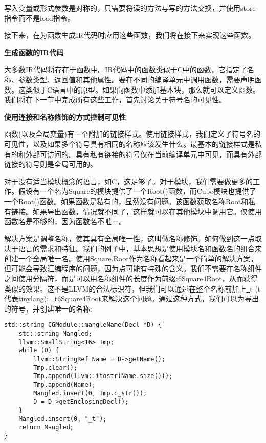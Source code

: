写入变量或形式参数是对称的，只需要将读的方法与写的方法交换，并使用store指令而不是load指令。\par

接下来，在为函数生成IR代码时应用这些函数，我们将在接下来实现这些函数。\par

\hspace*{\fill} \par %
\textbf{生成函数的IR代码}

大多数IR代码将存在于函数中。IR代码中的函数类似于C中的函数，它指定了名称、参数类型、返回值和其他属性。要在不同的编译单元中调用函数，需要声明函数。这类似于C语言中的原型。如果向函数中添加基本块，那么就可以定义函数。我们将在下一节中完成所有这些工作，首先讨论关于符号名的可见性。\par

\hspace*{\fill} \par %
\textbf{使用连接和名称修饰的方式控制可见性}

函数(以及全局变量)有一个附加的链接样式。使用链接样式，我们定义了符号名的可见性，以及如果多个符号具有相同的名称应该发生什么。最基本的链接样式是私有的和外部可访问的。具有私有链接的符号仅在当前编译单元中可见，而具有外部链接的符号则是全局可用的。\par

对于没有适当模块概念的语言，如C，这足够了。对于模块，我们需要做更多的工作。假设有一个名为Square的模块提供了一个Root()函数，而Cube模块也提供了一个Root()函数。如果函数是私有的，显然没有问题。该函数获取名称Root和私有链接。如果导出函数，情况就不同了，这样就可以在其他模块中调用它。仅使用函数名是不够的，因为函数名不唯一。\par

解决方案是调整名称，使其具有全局唯一性，这叫做名称修饰。如何做到这一点取决于语言的需求和特征。我们的例子中，基本思想是使用模块名和函数名的组合来创建一个全局唯一名。使用Square.Root作为名称看起来是一个简单的解决方案，但可能会导致汇编程序的问题，因为点可能有特殊的含义。我们不需要在名称组件之间使用分隔符，而是可以用名称组件的长度作为前缀:6Square4Root，从而获得类似的效果。这不是LLVM的合法标识符，但我们可以通过在整个名称前加上\underline{~}t (t代表tinylang): \underline{~}t6Square4Root来解决这个问题。通过这种方式，我们可以为导出的符号，并创建唯一的名称:\par

\begin{lstlisting}[caption={}]
std::string CGModule::mangleName(Decl *D) {
	std::string Mangled;
	llvm::SmallString<16> Tmp;
	while (D) {
		llvm::StringRef Name = D->getName();
		Tmp.clear();
		Tmp.append(llvm::itostr(Name.size()));
		Tmp.append(Name);
		Mangled.insert(0, Tmp.c_str());
		D = D->getEnclosingDecl();
	}
	Mangled.insert(0, "_t");
	return Mangled;
}
\end{lstlisting}

